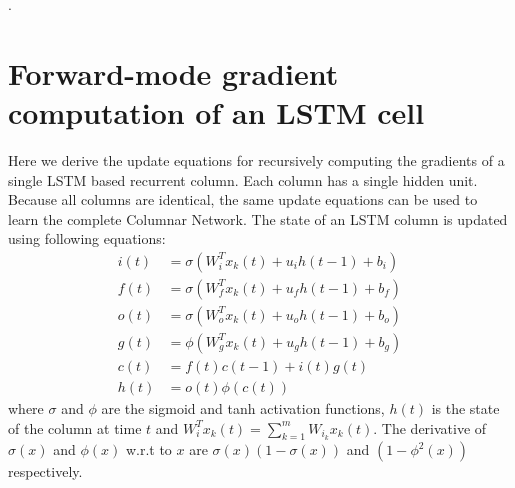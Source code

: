\documentclass{article}
\begin{document}
 

\nocite{sutton1992adapting}
\nocite{finn2017model}
\nocite{kingma2014adam}
\nocite{rumelhart1986learning}
\nocite{werbos1974beyond}
\nocite{werbos1988generalization}
\nocite{li2017meta}
\nocite{javed2019meta}
\nocite{bengio2019meta}
\nocite{williams1989learning}
\nocite{robinson1987utility}
\nocite{vivek}
\nocite{animallearning}
\nocite{hochreiter1997long}
\nocite{menick2020practical}
\nocite{tallec2017unbiased}
\nocite{cooijmans2019variance}
\nocite{sutskever2013training}
\nocite{elman1990finding}
\nocite{mikolov2009neural}
\nocite{mikolov2010recurrent}
\nocite{ollivier2015training}
\nocite{bengio1990learning}
\nocite{cho2014learning}
\nocite{glorot2010understanding}
\nocite{mujika2018approximating}
\nocite{williams1990efficient}
\nocite{kapturowski2018recurrent}
\nocite{pllr}
\nocite{schmidhuber1987evolutionary}. 
\nocite{glorot2011deep}
\nocite{Tange2011a}





\onecolumn 
\appendix


\section{Forward-mode gradient computation of an LSTM cell }

Here we derive the update equations for recursively computing the gradients of a single LSTM based recurrent column. Each column has a single hidden unit. Because all columns are identical, the same update equations can be used to learn the complete Columnar Network.  The state of an LSTM column is updated using following equations: 
\begin{align}
i(t) &= \sigma( W_{i}^T x_k(t) + u_{i} h(t-1) + b_i) \label{i} \\
f(t) &= \sigma( W_{f}^T x_k(t) + u_{f} h(t-1) + b_f) \label{f} \\
o(t) &= \sigma( W_{o}^T x_k(t) + u_{o} h(t-1) + b_o) \label{o} \\
g(t) &= \phi( W_{g}^T x_k(t) + u_{g} h(t-1) + b_g) \label{g} \\
c(t) &= f(t)  c(t-1) + i(t) g(t) \label{c} \\
h(t) &= o(t)  \phi(c(t)) \label{state_update}
\end{align}
where $\sigma$ and $\phi$ are the sigmoid and tanh activation functions, $h(t)$ is the state of the column at time $t$ and $ W_{i}^T x_k(t) = \sum_{k=1}^m W_{i_k} x_k(t)$. The derivative of $\sigma(x)$ and $\phi(x)$ w.r.t to $x$ are $\sigma(x)(1-\sigma(x))$ and $(1-\phi^2(x))$ respectively.
\end{document}
